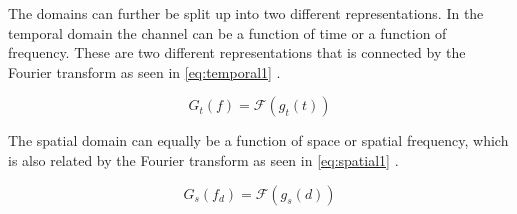 
The domains can further be split up into two different representations. In the temporal domain the channel can be a function of time or a function of frequency. These are two different representations that is connected by the Fourier transform as seen in \autoref{eq:temporal1} \citep[p. 43]{Wireless_CommunicationsBook}.

\begin{equation}\label{eq:temporal1}
G_t(f) = \mathcal{F}(g_t(t))
\end{equation}
\begin{where}
\end{where}


The spatial domain can equally be a function of space or spatial frequency, which is also related by the Fourier transform as seen in \autoref{eq:spatial1} \citep[p. 43]{Wireless_CommunicationsBook}.

\begin{equation}\label{eq:spatial1}
G_s(f_d) = \mathcal{F}(g_s(d))
\end{equation}
\begin{where}
\end{where}


